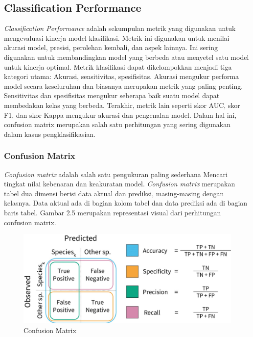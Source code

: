 \subsection{Classification Performance}
\emph{Classification Performance} adalah sekumpulan metrik yang digunakan untuk mengevaluasi kinerja model klasifikasi. Metrik ini digunakan untuk menilai akurasi model, presisi, perolehan kembali, dan aspek lainnya. Ini sering digunakan untuk membandingkan model yang berbeda atau menyetel satu model untuk kinerja optimal. Metrik klasifikasi dapat dikelompokkan menjadi tiga kategori utama: Akurasi, sensitivitas, spesifisitas. Akurasi mengukur performa model secara keseluruhan dan biasanya merupakan metrik yang paling penting. Sensitivitas dan spesifisitas mengukur seberapa baik suatu model dapat membedakan kelas yang berbeda. Terakhir, metrik lain seperti skor AUC, skor F1, dan skor Kappa mengukur akurasi dan pengenalan model.  Dalam hal ini, confusion matrix merupakan salah satu perhitungan yang sering digunakan dalam kasus
pengklasifikasian.
\subsubsection{Confusion Matrix}
\emph{Confusion matrix} adalah salah satu pengukuran paling sederhana
Mencari tingkat nilai kebenaran dan keakuratan model. \emph{Confusion matrix}
merupakan tabel dua dimensi berisi data aktual dan prediksi, masing-masing dengan kelasnya. Data aktual ada di bagian kolom tabel dan data prediksi ada di bagian baris tabel. Gambar 2.5 merupakan representasi visual dari perhitungan confusion matrix. 
\begin{figure} [H] \centering
  \includegraphics[scale=0.3]{gambar/confusionmatrix.jpg}
  \caption{Confusion Matrix }
  \label{fig:Confusion matrix }
\end{figure}

